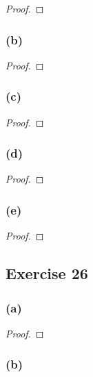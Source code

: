 \documentclass[14pt]{extarticle}
\begin{document}
\begin{proof}

\end{proof}

\subsubsection{(b)}

\begin{proof}

\end{proof}

\subsubsection{(c)}

\begin{proof}

\end{proof}

\subsubsection{(d)}

\begin{proof}

\end{proof}

\subsubsection{(e)}

\begin{proof}

\end{proof}

\subsection{Exercise 26}

\subsubsection{(a)}

\begin{proof}

\end{proof}

\subsubsection{(b)}
\end{document}
